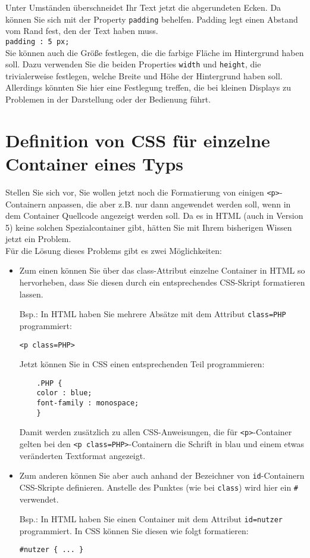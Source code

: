 Unter Umständen überschneidet Ihr Text jetzt die abgerundeten Ecken. Da können Sie sich mit der Property \verb|padding| behelfen. Padding legt einen Abstand vom Rand fest, den der Text haben muss.\\

\verb|padding : 5 px;|\\

Sie können auch die Größe festlegen, die die farbige Fläche im Hintergrund haben soll. Dazu verwenden Sie die beiden Properties \verb|width| und \verb|height|, die trivialerweise festlegen, welche Breite und Höhe der Hintergrund haben soll. Allerdings könnten Sie hier eine Festlegung treffen, die bei kleinen Displays zu Problemen in der Darstellung oder der Bedienung führt.

\section{Definition von CSS für einzelne Container eines Typs}

Stellen Sie sich vor, Sie wollen jetzt noch die Formatierung von einigen \verb|<p>|-Containern anpassen, die aber z.B. nur dann angewendet werden soll, wenn in dem Container Quellcode angezeigt werden soll. Da es in HTML (auch in Version 5) keine solchen Spezialcontainer gibt, hätten Sie mit Ihrem bisherigen Wissen jetzt ein Problem.\\

Für die Lösung dieses Problems gibt es zwei Möglichkeiten:
\begin{itemize}
	\item Zum einen können Sie über das class-Attribut einzelne Container in HTML so hervorheben, dass Sie diesen durch ein entsprechendes CSS-Skript formatieren lassen.

	Bsp.: In HTML haben Sie mehrere Absätze mit dem Attribut \verb|class=PHP| programmiert: 
	
	\verb|<p class=PHP>|
	
	Jetzt können Sie in CSS einen entsprechenden Teil programmieren:
	
	\begin{verbatim}
	.PHP {
	color : blue;
	font-family : monospace;
	}
	\end{verbatim}

	Damit werden zusätzlich zu allen CSS-Anweisungen, die für \verb|<p>|-Container gelten bei den \verb|<p class=PHP>|-Containern die Schrift in blau und einem etwas veränderten Textformat angezeigt.
	
	\item Zum anderen können Sie aber auch anhand der Bezeichner von \verb|id|-Containern CSS-Skripte definieren. Anstelle des Punktes (wie bei \verb|class|) wird hier ein \verb|#| verwendet.
	
	Bsp.: In HTML haben Sie einen Container mit dem Attribut \verb|id=nutzer| programmiert.
	In CSS können Sie diesen wie folgt formatieren:
	
	\verb|#nutzer { ... }|
\end{itemize}

